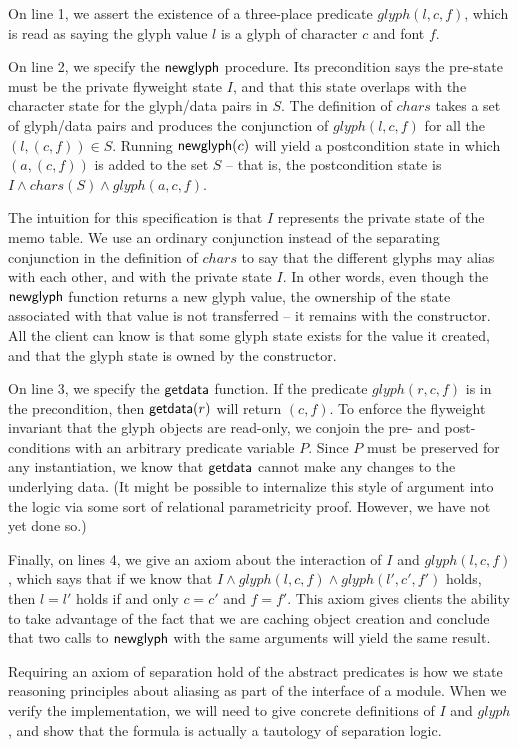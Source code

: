 On line 1, we assert the existence of a three-place predicate
$glyph(l, c, f)$, which is read as saying the glyph value $l$ is a
glyph of character $c$ and font $f$. 

On line 2, we specify the $\mathsf{newglyph}$ procedure. Its
precondition says the pre-state must be the private flyweight state
$I$, and that this state overlaps with the character state for the
glyph/data pairs in $S$. The definition of $chars$ takes a set of
glyph/data pairs and produces the conjunction of $glyph(l,c,f)$ for
all the $(l,(c,f)) \in S$. Running $\mathsf{newglyph}(c)$ will yield a
postcondition state in which $(a, (c,f))$ is added to the set $S$ --
that is, the postcondition state is $I \land chars(S) \land
glyph(a,c,f)$.

The intuition for this specification is that $I$ represents the
private state of the memo table. We use an ordinary conjunction
instead of the separating conjunction in the definition of $chars$ to
say that the different glyphs may alias with each other, and with the
private state $I$. In other words, even though the $\mathsf{newglyph}$
function returns a new glyph value, the ownership of the state
associated with that value is not transferred -- it remains with the
constructor. All the client can know is that some glyph state exists
for the value it created, and that the glyph state is owned by the
constructor.

On line 3, we specify the $\mathsf{getdata}$ function. If the predicate
$glyph(r, c, f)$ is in the precondition, then $\mathsf{getdata}(r)$
will return $(c, f)$.  To enforce the flyweight invariant that the
glyph objects are read-only, we conjoin the pre- and post-conditions
with an arbitrary predicate variable $P$. Since $P$ must be preserved
for any instantiation, we know that $\mathsf{getdata}$ cannot make any
changes to the underlying data. (It might be possible to internalize
this style of argument into the logic via some sort of relational
parametricity proof. However, we have not yet done so.)

Finally, on lines 4, we give an axiom about the interaction of $I$ and
$glyph(l,c,f)$, which says that if we know that $I \land glyph(l,c,f)
\land glyph(l',c', f')$ holds, then $l = l'$ holds if and only $c =
c'$ and $f = f'$. This axiom gives clients the ability to take
advantage of the fact that we are caching object creation and conclude
that two calls to $\mathsf{newglyph}$ with the same arguments will
yield the same result. 

Requiring an axiom of separation hold of the abstract predicates is
how we state reasoning principles about aliasing as part of the
interface of a module. When we verify the implementation, we will need
to give concrete definitions of $I$ and $glyph$, and show that the
formula is actually a tautology of separation logic.

